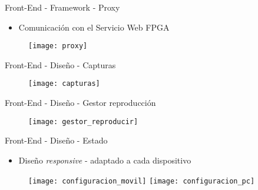 \begin{frame}{Front-End - Framework - Proxy}
  \begin{itemize}
    \item Comunicación con el Servicio Web FPGA
  \end{itemize}
  \begin{figure}
    \texttt{[image: proxy]}
  \end{figure}
\end{frame}

\begin{frame}{Front-End - Diseño - Capturas}
  \begin{figure}
    \texttt{[image: capturas]}
  \end{figure}
\end{frame}

\begin{frame}{Front-End - Diseño - Gestor reproducción}
  \begin{figure}
    \texttt{[image: gestor\_reproducir]}
  \end{figure}
\end{frame}

\begin{frame}{Front-End - Diseño - Estado}
  \begin{itemize}
    \item Diseño \textit{responsive} - adaptado a cada dispositivo
  \end{itemize}
  \begin{figure}
    \texttt{[image: configuracion\_movil]}
    \hfill
    \texttt{[image: configuracion\_pc]}
  \end{figure}
\end{frame}
